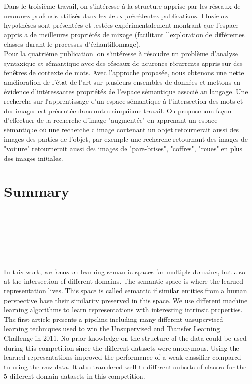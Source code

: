 \vspace{-0.2cm}
Dans le troisième travail, on s'intéresse à la structure apprise par les
réseaux de neurones profonds utilisés dans les deux précédentes publications.
Plusieurs hypothèses sont présentées et testées expérimentalement montrant que
l'espace appris a de meilleures propriétés de mixage (facilitant l'exploration de
différentes classes durant le processus d'échantillonnage).
\\

\vspace{-0.2cm}
Pour la quatrième publication, on s'intéresse à résoudre un problème d'analyse
syntaxique et sémantique avec des réseaux de neurones récurrents appris sur des
fenêtres de contexte de mots. Avec l'approche proposée, nous obtenons une nette amélioration de l'état de
l'art sur plusieurs ensembles de données et mettons en évidence d'intéressantes propriétés de
l'espace sémantique associé au langage.  Une recherche sur l'apprentissage d'un
espace sémantique à l'intersection des mots et des images est présentée dans
notre cinquième travail. On propose une façon d'effectuer de la recherche
d'image "augmentée" en apprenant un espace sémantique où une recherche d'image
contenant un objet retournerait aussi des images des parties de l'objet, par
exemple une recherche retournant des images de  "voiture" retournerait aussi
des images de "pare-brises", "coffres", "roues" en plus des images initiales.
 
\chapter*{Summary\\~~~~~~~~\\~~~~~~~~~~~\\~~~~~~~~~~}

\vspace{-3cm}

In this work, we focus on learning semantic spaces for multiple domains, but
also at the intersection of different domains. The semantic space is where the
learned representation lives. This space is called semantic if similar
entities from a human perspective have their similarity preserved in this
space.  We use different machine learning algorithms to learn representations
with interesting intrinsic properties. 
\\

\vspace{-0.2cm} The first article presents a pipeline including many different
unsupervised learning techniques used to win the Unsupervised and Transfer
Learning Challenge in 2011. No prior knowledge on the structure of the data
could be used during this competition since the different datasets were
anonymous. Using the learned representations improved the performance of a weak
classifier compared to using the raw data. It also transfered well to different
subsets of classes for the $5$ different domain datasets in this competition.

